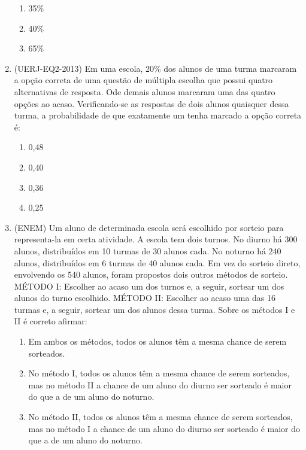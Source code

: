 \begin{enumerate}
\begin{enumerate}
\item {} 
35\%

\item {} 
40\%

\item {} 
65\%

\end{enumerate}

\item (UERJ-EQ2-2013) Em uma escola, 20\% dos alunos de uma turma marcaram a opção correta de uma questão de múltipla escolha que possui quatro alternativas de resposta. Ode demais alunos marcaram uma das quatro opções ao acaso. Verificando-se as respostas de dois alunos quaisquer dessa turma, a probabilidade de que exatamente um tenha marcado a opção correta é:
\begin{enumerate}
\item {} 
0,48

\item {} 
0,40

\item {} 
0,36

\item {} 
0,25

\end{enumerate}

\item (ENEM) Um aluno de determinada escola será escolhido por sorteio para representa-la em certa atividade. A escola tem dois turnos. No diurno há 300 alunos, distribuídos em 10 turmas de 30 alunos cada. No noturno há 240 alunos, distribuídos em 6 turmas de 40 alunos cada. Em vez do sorteio direto, envolvendo os 540 alunos, foram propostos dois outros métodos de sorteio.
MÉTODO I: Escolher ao acaso um dos turnos e, a seguir, sortear um dos alunos do turno escolhido.
MÉTODO II: Escolher ao acaso uma das 16 turmas e, a seguir, sortear um dos alunos dessa turma.
Sobre os métodos I e II é correto afirmar:
\begin{enumerate}
\item {} 
Em ambos os métodos, todos os alunos têm a mesma chance de serem sorteados.

\item {} 
No método I, todos os alunos têm a mesma chance de serem sorteados, mas no método II a chance de um aluno do diurno ser sorteado é maior do que a de um aluno do noturno.

\item {} 
No método II, todos os alunos têm a mesma chance de serem sorteados, mas no método I a chance de um aluno do diurno ser sorteado é maior do que a de um aluno do noturno.


\end{enumerate}
\end{enumerate}
